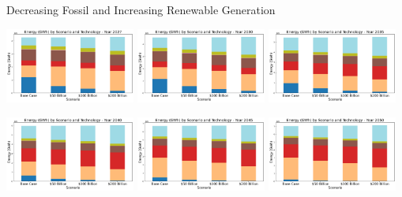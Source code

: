 \documentclass{beamer}
\begin{document}
\begin{frame}{Decreasing Fossil and Increasing Renewable Generation}
\begin{adjustwidth}{-3em}{-1.5em}

    \centering
    \begin{minipage}{1.1\textwidth}
        \centering
        \includegraphics[width=0.32\textwidth]{Figures/EndogenousPaper/Dispatch_Relative_by_scenario_2027.png} \hfill
        \includegraphics[width=0.32\textwidth]{Figures/EndogenousPaper/Dispatch_Relative_by_scenario_2030.png} \hfill
        \includegraphics[width=0.32\textwidth]{Figures/EndogenousPaper/Dispatch_Relative_by_scenario_2035.png}
    \end{minipage}
    
    \vspace{0.5cm}
    
    \begin{minipage}{1.1\textwidth}
        \centering
        \includegraphics[width=0.32\textwidth]{Figures/EndogenousPaper/Dispatch_Relative_by_scenario_2040.png} \hfill
        \includegraphics[width=0.32\textwidth]{Figures/EndogenousPaper/Dispatch_Relative_by_scenario_2045.png} \hfill
        \includegraphics[width=0.32\textwidth]{Figures/EndogenousPaper/Dispatch_Relative_by_scenario_2050.png}
    \end{minipage}
\end{adjustwidth}
\end{frame}
\end{document}
